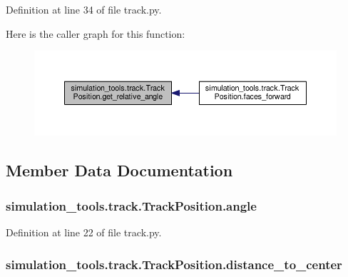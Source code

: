 Definition at line 34 of file track.\+py.



Here is the caller graph for this function\+:
\nopagebreak
\begin{figure}[H]
\begin{center}
\leavevmode
\includegraphics[width=350pt]{classsimulation__tools_1_1track_1_1_track_position_ae4cf3681d7edde291e3c566cfb21397a_icgraph}
\end{center}
\end{figure}




\subsection{Member Data Documentation}
\subsubsection[{\texorpdfstring{angle}{angle}}]{\setlength{\rightskip}{0pt plus 5cm}simulation\+\_\+tools.\+track.\+Track\+Position.\+angle}\hypertarget{classsimulation__tools_1_1track_1_1_track_position_a4809c7245ab044b2b3ca96fbdc80fe72}{}\label{classsimulation__tools_1_1track_1_1_track_position_a4809c7245ab044b2b3ca96fbdc80fe72}


Definition at line 22 of file track.\+py.

\subsubsection[{\texorpdfstring{distance\+\_\+to\+\_\+center}{distance_to_center}}]{\setlength{\rightskip}{0pt plus 5cm}simulation\+\_\+tools.\+track.\+Track\+Position.\+distance\+\_\+to\+\_\+center}\hypertarget{classsimulation__tools_1_1track_1_1_track_position_a1d45644ad2113e0c7a8e546f52015d46}{}\label{classsimulation__tools_1_1track_1_1_track_position_a1d45644ad2113e0c7a8e546f52015d46}


